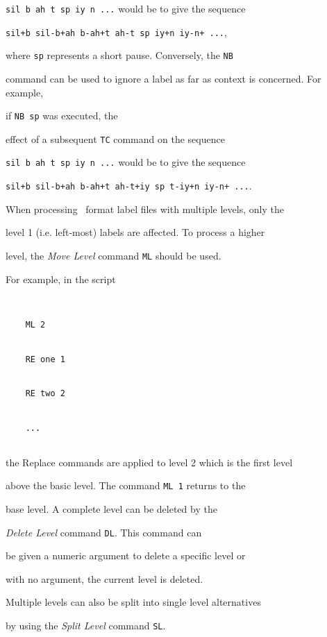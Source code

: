 \texttt{sil b ah t sp iy n ...} would be to give the sequence 


\texttt{sil+b sil-b+ah b-ah+t ah-t sp iy+n iy-n+ ...}, 


where \texttt{sp} represents a short pause. Conversely, the \texttt{NB} 


command can be used to ignore a label as far as context is concerned.  For example,


if  \texttt{NB sp} was executed, the


effect of a subsequent \texttt{TC} command on the sequence 


\texttt{sil b ah t sp iy n ...} would be to give the sequence 


\texttt{sil+b sil-b+ah b-ah+t ah-t+iy sp t-iy+n iy-n+ ...}.





When processing \HTK\ format label files with multiple levels, only the 


level 1 (i.e. left-most) labels are affected.  To process a higher


level, the \textit{Move Level} command \texttt{ML} should be used.


For example, in the script


\begin{verbatim}


    ML 2


    RE one 1


    RE two 2


    ...


\end{verbatim}


the Replace commands are applied to level 2 which is the first level


above the basic level.  The command \texttt{ML 1} returns to the 


base level.  A complete level can be deleted by the 


\textit{Delete Level} command \texttt{DL}.  This command can


be given a numeric argument to delete a specific level or


with no argument, the current level is deleted.


Multiple levels can also be split into single level alternatives


by using the \textit{Split Level} command \texttt{SL}.





